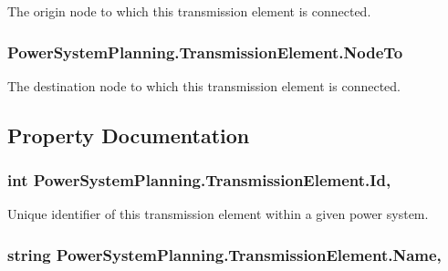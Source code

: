 The origin node to which this transmission element is connected. 

\subsubsection[{\texorpdfstring{Node\+To}{NodeTo}}]{ Power\+System\+Planning.\+Transmission\+Element.\+Node\+To}\hypertarget{class_power_system_planning_1_1_transmission_element_adfffaeb9dab17f7f2bafec0f319b2fe5}{}\label{class_power_system_planning_1_1_transmission_element_adfffaeb9dab17f7f2bafec0f319b2fe5}


The destination node to which this transmission element is connected. 



\subsection{Property Documentation}
\subsubsection[{\texorpdfstring{Id}{Id}}]{\setlength{\rightskip}{0pt plus 5cm}int Power\+System\+Planning.\+Transmission\+Element.\+Id\hspace{0.3cm}{\ttfamily [get]}, {\ttfamily [set]}}\hypertarget{class_power_system_planning_1_1_transmission_element_a2a3a213849ad09bfc8a52d13e9d7a0e2}{}\label{class_power_system_planning_1_1_transmission_element_a2a3a213849ad09bfc8a52d13e9d7a0e2}


Unique identifier of this transmission element within a given power system. 

\subsubsection[{\texorpdfstring{Name}{Name}}]{\setlength{\rightskip}{0pt plus 5cm}string Power\+System\+Planning.\+Transmission\+Element.\+Name\hspace{0.3cm}{\ttfamily [get]}, {\ttfamily [set]}}\hypertarget{class_power_system_planning_1_1_transmission_element_a5147d0e7710dbb8d28988a40c9e8ac3c}{}\label{class_power_system_planning_1_1_transmission_element_a5147d0e7710dbb8d28988a40c9e8ac3c}


